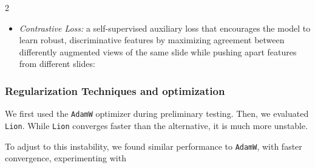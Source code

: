 \documentclass[11pt]{article}
\begin{document}
\begin{multicols}{2}
\begin{itemize}[noitemsep,topsep=0pt]
            \item \textit{Contrastive Loss:} a self-supervised auxiliary loss that encourages the model to learn robust, discriminative features by maximizing agreement between differently augmented views of the same slide while pushing apart features from different slides: 
        \end{itemize}
        \vspace{-2mm}
        \subsubsection{Regularization Techniques and optimization}
 
       We first used the \texttt{AdamW} optimizer during preliminary testing. Then, we evaluated \texttt{Lion}. While \texttt{Lion} converges faster than the alternative, it is much more unstable.

       To adjust to this instability, we found similar performance to \texttt{AdamW}, with faster convergence, experimenting with
       
    \begin{table}[H]
    \centering
    \footnotesize
    \captionsetup{justification=centering}
    \caption{Hyperparameter configurations}
    \label{tab:optimizer_comparison_transposed}
\end{table}


\end{multicols}
\end{document}

